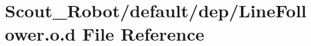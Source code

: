 \hypertarget{_line_follower_8o_8d}{
\section{Scout\_\-Robot/default/dep/LineFollower.o.d File Reference}
\label{_line_follower_8o_8d}
}
